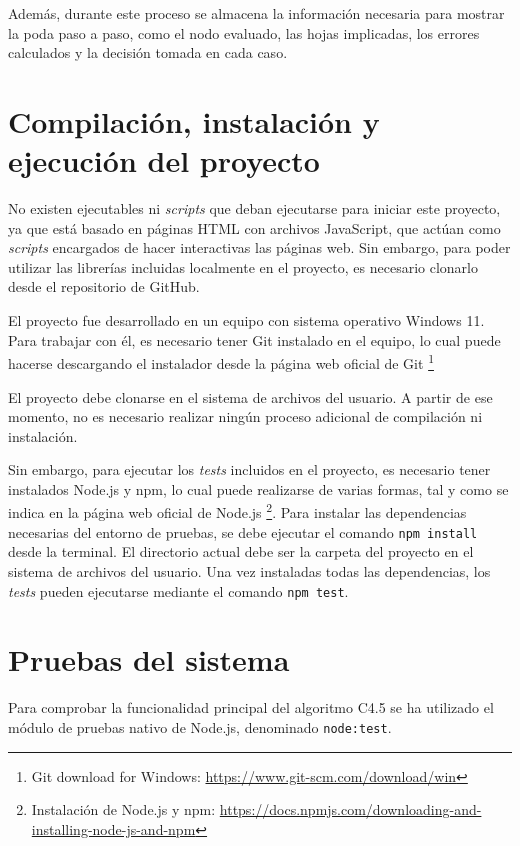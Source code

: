 Además, durante este proceso se almacena la información necesaria para mostrar la poda paso a paso, como el nodo evaluado, las hojas implicadas, los errores calculados y la decisión tomada en cada caso.


\section{Compilación, instalación y ejecución del proyecto}

No existen ejecutables ni \textit{scripts} que deban ejecutarse para iniciar este proyecto, ya que está basado en páginas HTML con archivos JavaScript, que actúan como \textit{scripts} encargados de hacer interactivas las páginas web. Sin embargo, para poder utilizar las librerías incluidas localmente en el proyecto, es necesario clonarlo desde el repositorio de GitHub.

El proyecto fue desarrollado en un equipo con sistema operativo Windows 11. Para trabajar con él, es necesario tener Git instalado en el equipo, lo cual puede hacerse descargando el instalador desde la página web oficial de Git \footnote{Git download for Windows: \url{https://www.git-scm.com/download/win}}

El proyecto debe clonarse en el sistema de archivos del usuario. A partir de ese momento, no es necesario realizar ningún proceso adicional de compilación ni instalación.

Sin embargo, para ejecutar los \textit{tests} incluidos en el proyecto, es necesario tener instalados Node.js y npm, lo cual puede realizarse de varias formas, tal y como se indica en la página web oficial de Node.js \footnote{Instalación de Node.js y npm: \url{https://docs.npmjs.com/downloading-and-installing-node-js-and-npm}}. Para instalar las dependencias necesarias del entorno de pruebas, se debe ejecutar el comando \texttt{npm install} desde la terminal. El directorio actual debe ser la carpeta del proyecto en el sistema de archivos del usuario. Una vez instaladas todas las dependencias, los \textit{tests} pueden ejecutarse mediante el comando \texttt{npm test}.


\section{Pruebas del sistema}

Para comprobar la funcionalidad principal del algoritmo C4.5 se ha utilizado el módulo de pruebas nativo de Node.js, denominado \texttt{node:test}.

